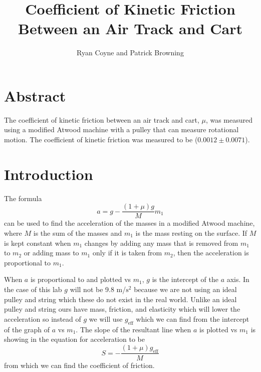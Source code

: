 \documentclass[12pt]{article}
\begin{document}
    \title{Coefficient of Kinetic Friction Between an Air Track and Cart}
    \author{Ryan Coyne and Patrick Browning}
    \maketitle
    \section{Abstract}
        The coefficient of kinetic friction between an air track and cart, \(\mu\), was measured using a modified Atwood machine with a pulley that can measure rotational motion. The coefficient of kinetic friction was measured to be (\(0.0012 \pm 0.0071\)).
    \section{Introduction}
        The formula
        \begin{equation*}
            a = g - \frac{(1+\mu)g}{M}m_1
        \end{equation*}
        can be used to find the acceleration of the masses in a modified Atwood machine, where \(M\) is the sum of the masses and \(m_1\) is the mass resting on the surface. If \(M\) is kept constant when \(m_1\) changes by adding any mass that is removed from \(m_1\) to \(m_2\) or adding mass to \(m_1\) only if it is taken from \(m_2\), then the acceleration is proportional to \(m_1\).
        
        When \(a\) is proportional to and plotted vs \(m_1\), \(g\) is the intercept of the \(a\) axis. In the case of this lab \(g\) will not be 9.8 m/\(\mathrm{s}^2\) because we are not using an ideal pulley and string which these do not exist in the real world. Unlike an ideal pulley and string ours have mass, friction, and elasticity which will lower the acceleration so instead of \(g\) we will use \(g_\mathrm{eff}\) which we can find from the intercept of the graph of \(a\) vs \(m_1\).  The slope of the resultant line when \(a\) is plotted vs \(m_1\) is showing in the equation for acceleration to be 
        \begin{equation*}
            S = - \frac{(1+\mu)g_\mathrm{eff}}{M}
        \end{equation*} 
        from which we can find the coefficient of friction.
\end{document}
